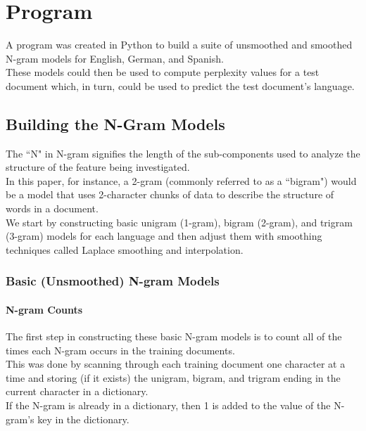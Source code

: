\documentclass[a4,10pt]{article}
\begin{document}
\section{Program}

A program was created in Python to build a suite of unsmoothed and smoothed N-gram models for English, German, and Spanish. \\

These models could then be used to compute perplexity values for a test document which, in turn, could be used to predict the test document's language. 

\subsection{Building the N-Gram Models}

The ``N" in N-gram signifies the length of the sub-components used to analyze the structure of the feature being investigated.  \\

In this paper, for instance, a 2-gram (commonly referred to as a ``bigram") would be a model that uses 2-character chunks of data to describe the structure of words in a document. \\

We start by constructing basic unigram (1-gram), bigram (2-gram), and trigram (3-gram) models for each language and then adjust them with smoothing techniques called Laplace smoothing and interpolation. 

\subsubsection{Basic (Unsmoothed) N-gram Models}

\paragraph{N-gram Counts}

The first step in constructing these basic N-gram models is to count all of the times each N-gram occurs in the training documents. \\

This was done by scanning through each training document one character at a time and storing (if it exists) the unigram, bigram, and trigram ending in the current character in a dictionary. \\

If the N-gram is already in a dictionary, then 1 is added to the value of the N-gram's key in the dictionary. \\
\end{document}

